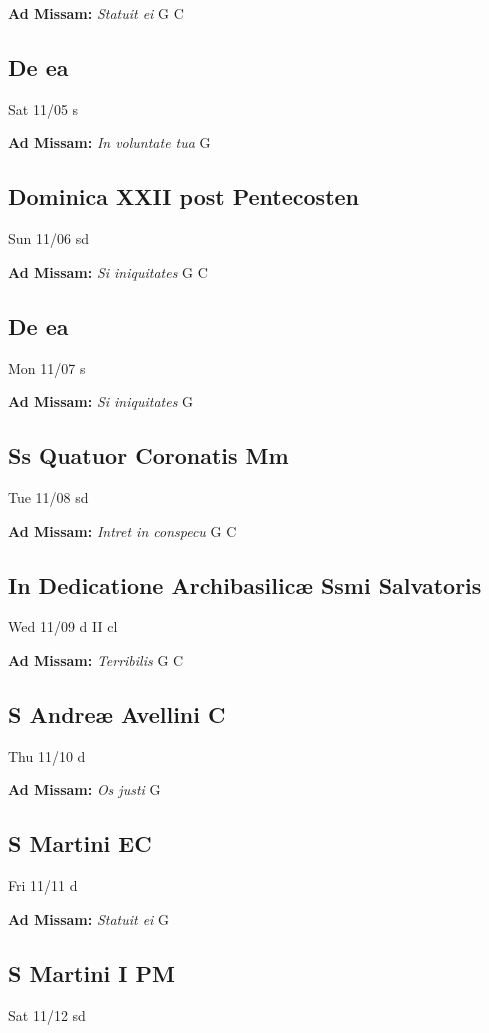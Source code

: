 \documentclass[letterpaper, 10pt, twocolumn]{article}
\begin{document}
\textbf{Ad Missam:} \textit{Statuit ei} G C 

\subsection*{De ea}Sat 11/05 s

\textbf{Ad Missam:} \textit{In voluntate tua} G 

\subsection*{Dominica XXII post Pentecosten}Sun 11/06 sd

\textbf{Ad Missam:} \textit{Si iniquitates} G C 

\subsection*{De ea}Mon 11/07 s

\textbf{Ad Missam:} \textit{Si iniquitates} G 

\subsection*{Ss Quatuor Coronatis Mm}Tue 11/08 sd

\textbf{Ad Missam:} \textit{Intret in conspecu} G C 

\subsection*{In Dedicatione Archibasilicæ Ssmi Salvatoris}Wed 11/09 d II cl

\textbf{Ad Missam:} \textit{Terribilis} G C 

\subsection*{S Andreæ Avellini C}Thu 11/10 d

\textbf{Ad Missam:} \textit{Os justi} G 

\subsection*{S Martini  EC}Fri 11/11 d

\textbf{Ad Missam:} \textit{Statuit ei} G 

\subsection*{S Martini I PM}Sat 11/12 sd
\end{document}
